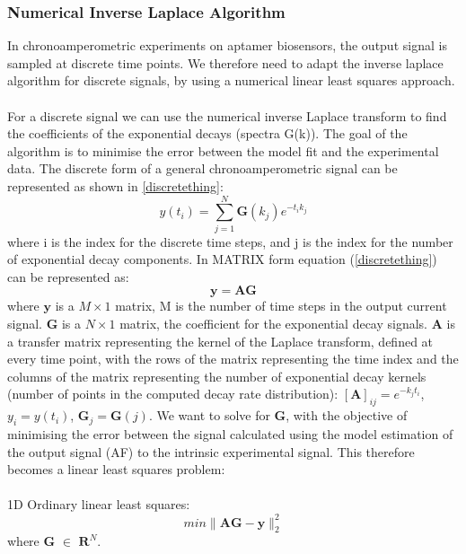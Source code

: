 \subsubsection{Numerical Inverse Laplace Algorithm}
In chronoamperometric experiments on aptamer biosensors, the output signal is sampled at discrete time points. We therefore need to adapt the inverse laplace algorithm for discrete signals, by using a numerical linear least squares approach.\\\\
For a discrete signal we can use the numerical inverse Laplace transform to find the coefficients of the exponential decays (spectra G(k)).
The goal of the algorithm is to minimise the error between the model fit and the experimental data.
The discrete form of a general chronoamperometric signal can be represented as shown in \autoref{discretething}:
\begin{equation}
    y(t_{i}) = \sum_{j=1}^{N} \mathbf{G}(k_{j})e^{-t_{i}k_{j}}
    \label{discretething}
\end{equation}
where i is the index for the discrete time steps, and j is the index for the number of exponential decay components. In MATRIX form equation (\autoref{discretething}) can be represented as:
$$ \mathbf{y = AG} $$
where $ \mathbf{y}$ is a $M\times 1$ matrix, M is the number of time steps in the output current signal. $\mathbf{G}$ is a $N\times 1$ matrix, the coefficient for the exponential decay signals. $\mathbf{A}$ is a transfer matrix representing the kernel of the Laplace
transform, defined at every time point, with the rows of the matrix representing the time index and the columns of the matrix representing the number of exponential decay kernels (number of points in the computed decay rate distribution): $ [\mathbf{A}]_{ij} = e^{-k_{j}t_{i}} $, $y_{i} = y(t_{i}) $, $\mathbf{G}_{j} = \mathbf{G}(j)$.
We want to solve for $\mathbf{G}$, with the objective of minimising the error between the signal calculated using the model estimation of the output signal (AF) to the intrinsic experimental signal. This therefore becomes a linear least squares problem:\\\\
1D Ordinary linear least squares:
\begin{equation}
    min\lVert \mathbf{AG} - \mathbf{y}\lVert^{2}_{2}
\end{equation}
where $\mathbf{G}$ $\in$ $\mathbf{R}^{N}$.\\\\
